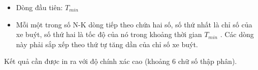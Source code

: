 \begin{itemize}
	\item     Dòng đầu tiên: $T_{min}$
	\item     Mỗi một trong số N-K dòng tiếp theo chứa hai số, số thứ nhất là chỉ số của xe buýt, số thứ hai là tốc độ của nó trong khoảng thời gian   $T_{min}$    . Các dòng này phải sắp xếp theo thứ tự tăng dần của chỉ số xe buýt.   
\end{itemize}

   Kết quả cần được in ra với độ chính xác cao (khoảng 6 chữ số thập phân).